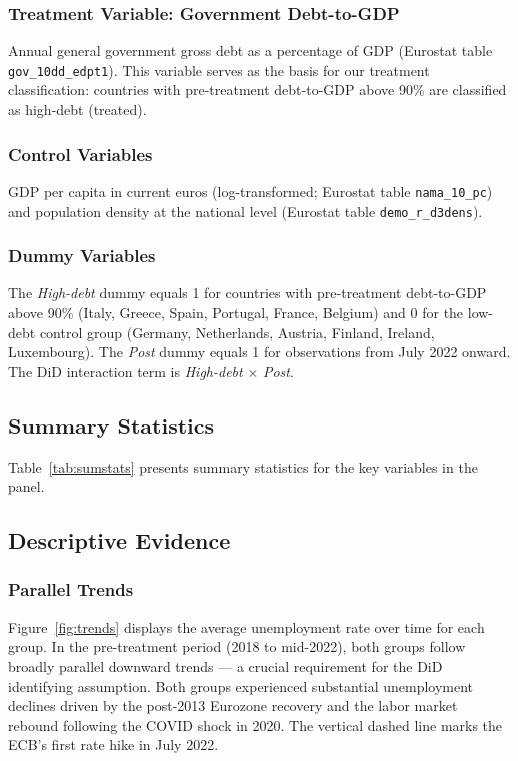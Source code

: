 \documentclass[12pt,a4paper]{article}
\begin{document}
\subsubsection{Treatment Variable: Government Debt-to-GDP}
Annual general government gross debt as a percentage of GDP (Eurostat table \texttt{gov\_10dd\_edpt1}). This variable serves as the basis for our treatment classification: countries with pre-treatment debt-to-GDP above 90\% are classified as high-debt (treated).

\subsubsection{Control Variables}
GDP per capita in current euros (log-transformed; Eurostat table \texttt{nama\_10\_pc}) and population density at the national level (Eurostat table \texttt{demo\_r\_d3dens}).

\subsubsection{Dummy Variables}
The \textit{High-debt} dummy equals 1 for countries with pre-treatment debt-to-GDP above 90\% (Italy, Greece, Spain, Portugal, France, Belgium) and 0 for the low-debt control group (Germany, Netherlands, Austria, Finland, Ireland, Luxembourg). The \textit{Post} dummy equals 1 for observations from July 2022 onward. The DiD interaction term is \textit{High-debt} $\times$ \textit{Post}.

\subsection{Summary Statistics}

Table~\ref{tab:sumstats} presents summary statistics for the key variables in the panel.



\subsection{Descriptive Evidence}

\subsubsection{Parallel Trends}

Figure~\ref{fig:trends} displays the average unemployment rate over time for each group. In the pre-treatment period (2018 to mid-2022), both groups follow broadly parallel downward trends --- a crucial requirement for the DiD identifying assumption. Both groups experienced substantial unemployment declines driven by the post-2013 Eurozone recovery and the labor market rebound following the COVID shock in 2020. The vertical dashed line marks the ECB's first rate hike in July 2022.
\end{document}

